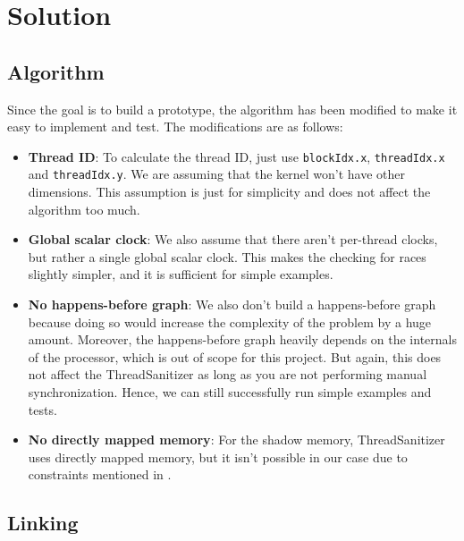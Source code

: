 \documentclass{btp}
\begin{document}
\section{Solution}

\subsection{Algorithm}

Since the goal is to build a prototype, the algorithm has been modified to make it easy to implement and test. The modifications are as follows:

\begin{itemize}
	\item \textbf{Thread ID}: To calculate the thread ID, just use \texttt{blockIdx.x}, \texttt{threadIdx.x} and \texttt{threadIdx.y}. We are assuming that the kernel won't have other dimensions. This assumption is just for simplicity and does not affect the algorithm too much.
	\item \textbf{Global scalar clock}: We also assume that there aren't per-thread clocks, but rather a single global scalar clock. This makes the checking for races slightly simpler, and it is sufficient for simple examples.
	\item \textbf{No happens-before graph}: We also don't build a happens-before graph because doing so would increase the complexity of the problem by a huge amount. Moreover, the happens-before graph heavily depends on the internals of the processor, which is out of scope for this project. But again, this does not affect the ThreadSanitizer as long as you are not performing manual synchronization. Hence, we can still successfully run simple examples and tests.
	\item \textbf{No directly mapped memory}: For the shadow memory, ThreadSanitizer uses directly mapped memory, but it isn't possible in our case due to constraints mentioned in .
\end{itemize}

\subsection{Linking}
\end{document}
